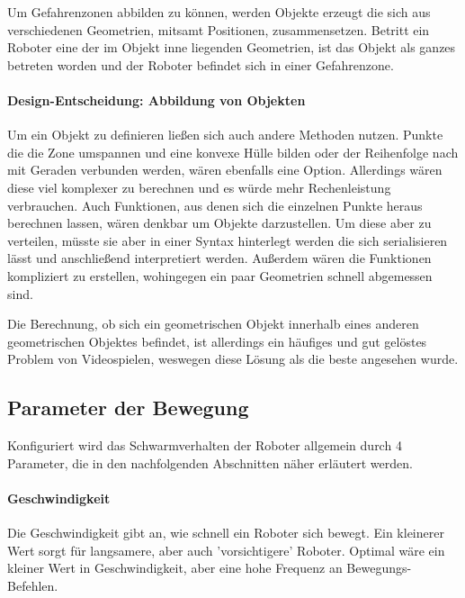 Um Gefahrenzonen abbilden zu können, werden Objekte erzeugt die sich aus verschiedenen Geometrien, mitsamt Positionen, zusammensetzen. Betritt ein Roboter eine der im Objekt inne liegenden Geometrien, ist das Objekt als ganzes betreten worden und der Roboter befindet sich in einer Gefahrenzone.

\paragraph*{Design-Entscheidung: Abbildung von Objekten}
Um ein Objekt zu definieren ließen sich auch andere Methoden nutzen. Punkte die die Zone umspannen und eine konvexe Hülle bilden oder der Reihenfolge nach mit Geraden verbunden werden, wären ebenfalls eine Option. Allerdings wären diese viel komplexer zu berechnen und es würde mehr Rechenleistung verbrauchen.
Auch Funktionen, aus denen sich die einzelnen Punkte heraus berechnen lassen, wären denkbar um Objekte darzustellen. Um diese aber zu verteilen, müsste sie aber in einer Syntax hinterlegt werden die sich serialisieren lässt und anschließend interpretiert werden. Außerdem wären die Funktionen kompliziert zu erstellen, wohingegen ein paar Geometrien schnell abgemessen sind.

Die Berechnung, ob sich ein geometrischen Objekt innerhalb eines anderen geometrischen Objektes befindet, ist allerdings ein häufiges und gut gelöstes Problem von Videospielen\cite{GamingCollision}, weswegen diese Lösung als die beste angesehen wurde.

\subsection*{Parameter der Bewegung}

Konfiguriert wird das Schwarmverhalten der Roboter allgemein durch 4 Parameter, die in den nachfolgenden Abschnitten näher erläutert werden.


\paragraph*{Geschwindigkeit} Die Geschwindigkeit gibt an, wie schnell ein Roboter sich bewegt. Ein kleinerer Wert sorgt für langsamere, aber auch 'vorsichtigere' Roboter. Optimal wäre ein kleiner Wert in Geschwindigkeit, aber eine hohe Frequenz an Bewegungs-Befehlen.

